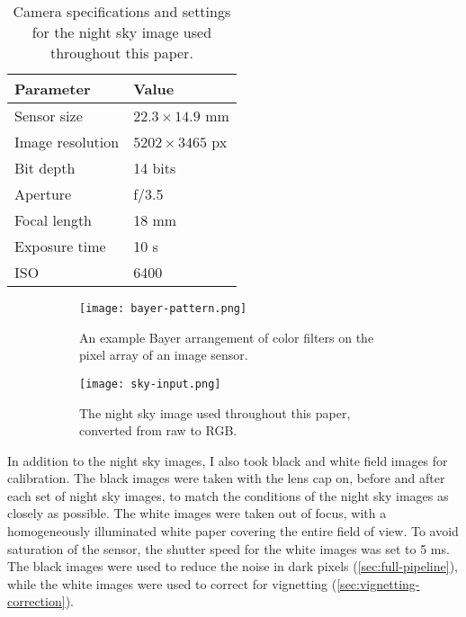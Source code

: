 \begin{table}[b]
  \centering
  \begin{tabular}{ll}
    \toprule
    \textbf{Parameter} & \textbf{Value}        \\
    \midrule
    Sensor size        & $22.3 \times 14.9$ mm \\
    Image resolution   & $5202 \times 3465$ px \\
    Bit depth          & 14 bits               \\
    Aperture           & f/3.5                 \\
    Focal length       & 18 mm                 \\
    Exposure time      & 10 s                  \\
    ISO                & 6400                  \\
    \bottomrule
  \end{tabular}
  \caption{Camera specifications and settings for the night sky image used throughout this paper.}
  \label{tab:camera-settings}
\end{table}

\begin{figure}[tb]
  \centering
  \begin{subfigure}{.45\textwidth}
    \centering
    \texttt{[image: bayer-pattern.png]}
    \caption{An example Bayer arrangement of color filters on the pixel array of an image sensor.}
    \label{fig:bayer-pattern}
  \end{subfigure}%
  \hfill
  \begin{subfigure}{.45\textwidth}
    \centering
    \texttt{[image: sky-input.png]}
    \caption{The night sky image used throughout this paper, converted from raw to RGB.}
    \label{fig:sky-input}
  \end{subfigure}
  \caption{}
\end{figure}

In addition to the night sky images, I also took black and white field images for
calibration. The black images were taken with the lens cap on, before and after each set
of night sky images, to match the conditions of the night sky images as closely as
possible. The white images were taken out of focus, with a homogeneously illuminated white
paper covering the entire field of view. To avoid saturation of the sensor, the shutter
speed for the white images was set to 5 ms. The black images were used to reduce the noise
in dark pixels (\autoref{sec:full-pipeline}), while the white images were used to correct
for vignetting (\autoref{sec:vignetting-correction}).

